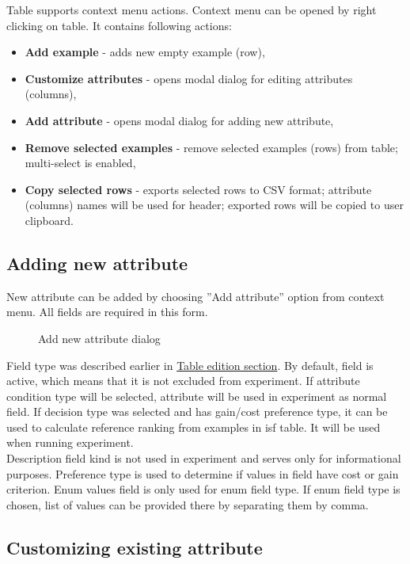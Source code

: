 Table supports context menu actions. Context menu can be opened by right clicking on table. It contains following actions:
\begin{itemize}
	\item \textbf{Add example} - adds new empty example (row),
	\item \textbf{Customize attributes} - opens modal dialog for editing attributes (columns),
	\item \textbf{Add attribute} - opens modal dialog for adding new attribute,
	\item \textbf{Remove selected examples} - remove selected examples (rows) from table; multi-select is enabled,
	\item \textbf{Copy selected rows} - exports selected rows to CSV format; attribute (columns) names will be used for header; exported rows will be copied to user clipboard.
\end{itemize}

\subsection{Adding new attribute}\label{sub:isf-add-attr}

New attribute can be added by choosing ''Add attribute'' option from context menu. All fields are required in this form.

\begin{figure*}[!ht] 
	\centering
	\caption{Add new attribute dialog}
\end{figure*}

Field type was described earlier in \hyperref[sub:isf-examples]{Table edition section}. By default, field is active, which means that it is not excluded from experiment.
If attribute condition type will be selected, attribute will be used in experiment as normal field. If decision type was selected and has gain/cost preference type, it can be used to calculate reference ranking from examples in isf table. It will be used when running experiment. 
\\ Description field kind is not used in experiment and serves only for informational purposes. Preference type is used to determine if values in field have cost or gain criterion. Enum values field is only used for enum field type. If enum field type is chosen, list of values can be provided there by separating them by comma.

\subsection{Customizing existing attribute}\label{sub:isf-cust-attr}

